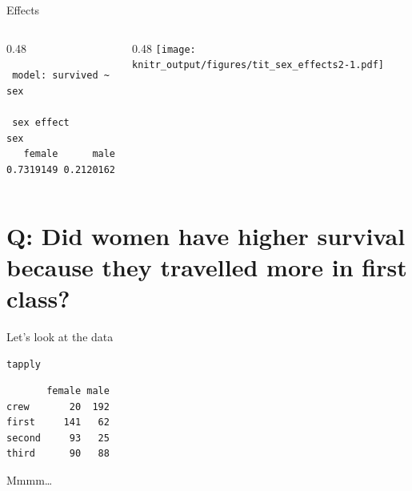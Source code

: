 \documentclass[10pt,ignorenonframetext,]{beamer}
\newenvironment{Shaded}{\begin{snugshade}}{\end{snugshade}}
\newcommand{\KeywordTok}[1]{\textcolor[rgb]{0.13,0.29,0.53}{\textbf{{#1}}}}
\newcommand{\NormalTok}[1]{{#1}}
\def\begincols{\begin{columns}[c]}
\def\endcols{\end{columns}}
\def\begincol{\begin{column}{0.48\textwidth}}
\def\endcol{\end{column}}
\begin{document}
\begin{frame}[fragile]{Effects}

\begincols
\begincol

\begin{verbatim}
 model: survived ~ sex

 sex effect
sex
   female      male 
0.7319149 0.2120162 
\end{verbatim}

\endcol

\begincol
\texttt{[image: knitr\_output/figures/tit\_sex\_effects2-1.pdf]} \endcol
\endcols

\end{frame}

\section{Q: Did women have higher survival because they travelled more
in first
class?}\label{q-did-women-have-higher-survival-because-they-travelled-more-in-first-class}

\begin{frame}[fragile]{Let's look at the data}

\texttt{tapply}

\begin{Shaded}
\end{Shaded}

\begin{verbatim}
       female male
crew       20  192
first     141   62
second     93   25
third      90   88
\end{verbatim}

Mmmm\ldots{}

\end{frame}
\end{document}
